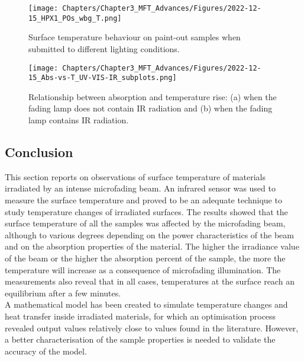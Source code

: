 \begin{figure*}[!h]
\centering
\texttt{[image: Chapters/Chapter3\_MFT\_Advances/Figures/2022-12-15\_HPX1\_POs\_wbg\_T.png]}
\caption[\hspace{0.3cm}Surface temperature behaviour on paint-out samples]{Surface temperature behaviour on paint-out samples when submitted to different lighting conditions.}
\label{fig:T-exp_dynamic_seq_T}
\end{figure*}

\begin{figure*}
\centering
\texttt{[image: Chapters/Chapter3\_MFT\_Advances/Figures/2022-12-15\_Abs-vs-T\_UV-VIS-IR\_subplots.png]}
\caption[\hspace{0.3cm}Relationship between absorption and temperature rise]{Relationship between absorption and temperature rise: (a) when the fading lamp does not contain \gls{IR} radiation and (b) when the fading lamp contains \gls{IR} radiation.}
\label{fig:T-exp_PO_mean-abs}
\end{figure*}




\subsection{Conclusion}

This section reports on observations of surface temperature of materials irradiated by an intense microfading beam. An infrared sensor was used to measure the surface temperature and proved to be an adequate technique to study temperature changes of irradiated surfaces. The results showed that the surface temperature of all the samples was affected by the microfading beam, although to various degrees depending on the power characteristics of the beam and on the absorption properties of the material. The higher the irradiance value of the beam or the higher the absorption percent of the sample, the more the temperature will increase as a consequence of microfading illumination. The measurements also reveal that in all cases, temperatures at the surface reach an equilibrium after a few minutes. \\

A mathematical model has been created to simulate temperature changes and heat transfer inside irradiated materials, for which an optimisation process revealed output values relatively close to values found in the literature. However, a better characterisation of the sample properties is needed to validate the accuracy of the model.\\

